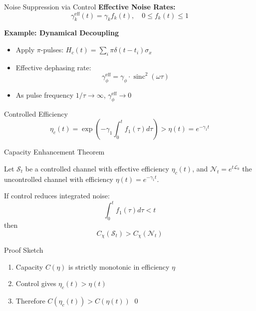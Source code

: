 \documentclass[aspectratio=169,12pt]{beamer}
\newcommand{\Lgen}{\mathcal{L}}
\newcommand{\SJ}{\mathcal{S}}
\DeclareMathOperator{\sinc}{sinc}
\begin{document}
\begin{frame}{Noise Suppression via Control}
\textbf{Effective Noise Rates:}
$$\gamma_k^{\text{eff}}(t) = \gamma_k f_k(t), \quad 0 \leq f_k(t) \leq 1$$

\vspace{0.3cm}

\textbf{Example: Dynamical Decoupling}
\begin{itemize}
\item Apply $\pi$-pulses: $H_c(t) = \sum_i \pi \delta(t-t_i) \sigma_x$
\item Effective dephasing rate:
$$\gamma_\phi^{\text{eff}} = \gamma_\phi \cdot \sinc^2(\omega \tau)$$
\item As pulse frequency $1/\tau \to \infty$, $\gamma_\phi^{\text{eff}} \to 0$
\end{itemize}

\vspace{0.3cm}

\begin{alertblock}{Controlled Efficiency}
$$\eta_c(t) = \exp\left( -\gamma_1 \int_0^t f_1(\tau) d\tau \right) > \eta(t) = e^{-\gamma_1 t}$$
\end{alertblock}
\end{frame}

\begin{frame}{Capacity Enhancement Theorem}
\begin{theorem}
Let $\SJ_t$ be a controlled channel with effective efficiency $\eta_c(t)$, and $\mathcal{N}_t = e^{t\Lgen_0}$ the uncontrolled channel with efficiency $\eta(t) = e^{-\gamma_1 t}$.

If control reduces integrated noise:
$$\int_0^t f_1(\tau) d\tau < t$$
then
$$C_\chi(\SJ_t) > C_\chi(\mathcal{N}_t)$$
\end{theorem}

\vspace{0.3cm}

\begin{block}{Proof Sketch}
\begin{enumerate}
\item Capacity $C(\eta)$ is strictly monotonic in efficiency $\eta$
\item Control gives $\eta_c(t) > \eta(t)$
\item Therefore $C(\eta_c(t)) > C(\eta(t))$ \qed
\end{enumerate}
\end{block}
\end{frame}
\end{document}
